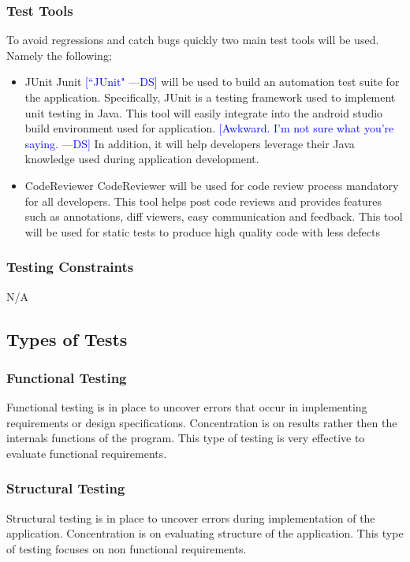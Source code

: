 \documentclass[12pt]{article}
\newcommand{\authornote}[3]{\textcolor{#1}{[#3 ---#2]}}
\newcommand{\authornote}[3]{}
\newcommand{\ds}[1]{\authornote{blue}{DS}{#1}}
\begin{document}
\subsubsection{Test Tools}
To avoid regressions and catch bugs quickly two main test tools will be used. Namely the following;
\begin{itemize}
\item JUnit \textemdash Junit 
\ds{``JUnit"}
will be used to build an automation test suite for the application. Specifically, JUnit is a testing framework used to implement unit testing in Java. 
This tool will easily integrate into the android studio build environment used for application.
\ds{Awkward. I'm not sure what you're saying.}
In addition, it will help developers leverage their Java knowledge used during application development. 
\item CodeReviewer \textemdash CodeReviewer will be used for code review process mandatory for all developers. This tool helps post code reviews and provides features such as annotations, diff viewers, easy communication and feedback. This tool will be used for static tests to produce high quality code with less defects
 \end{itemize}

\subsubsection{ Testing Constraints}
N/A

\subsection{Types of Tests}

\subsubsection{Functional Testing}
Functional testing is in place to uncover errors that occur in implementing requirements or design specifications. Concentration is on results rather then the internals functions of the program. This type of testing is very effective to evaluate functional requirements.

\subsubsection{Structural Testing}
Structural testing is in place to uncover errors during implementation of the application. Concentration is on evaluating structure of the application. This type of testing focuses on non functional requirements.  
\end{document}
